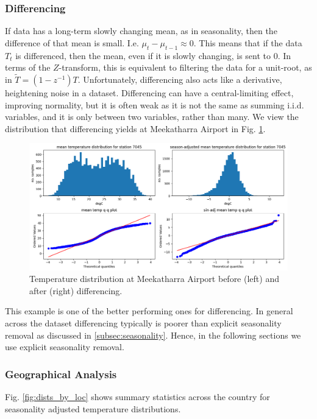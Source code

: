 \documentclass[12pt,a4paper]{article} %
\begin{document}
\subsubsection{Differencing}
\label{subsec:differencing}
If data has a long-term slowly changing mean, as in seasonality, then the difference of that mean is small. I.e. $\mu_t-\mu_{t-1}\approx0$. This means that if the data $T_t$ is differenced, then the mean, even if it is slowly changing, is sent to 0. In terms of the $Z$-transform, this is equivalent to filtering the data for a unit-root, as in $\tilde{T}=(1-z^{-1})T$. Unfortunately, differencing also acts like a derivative, heightening noise in a dataset. Differencing can have a central-limiting effect, improving normality, but it is often weak as it is not the same as summing i.i.d. variables, and it is only between two variables, rather than many. We view the distribution that differencing yields at Meekatharra Airport in Fig. \ref{fig:7045_dif_distribution}.
\begin{figure}[!ht]
    \centering
    \includegraphics[width=\linewidth]{mean_dist_7045_dif.png}
    \caption{Temperature distribution at Meekatharra Airport before (left) and after (right) differencing.}
    \label{fig:7045_dif_distribution}
\end{figure}
This example is one of the better performing ones for differencing. In general across the dataset differencing typically is poorer than explicit seasonality removal as discussed in \ref{subsec:seasonality}. Hence, in the following sections we use explicit seasonality removal.

\subsubsection{Geographical Analysis}
\label{subsec:geographical}
Fig. \ref{fig:dists_by_loc} shows summary statistics across the country for seasonality adjusted temperature distributions.
\end{document}

